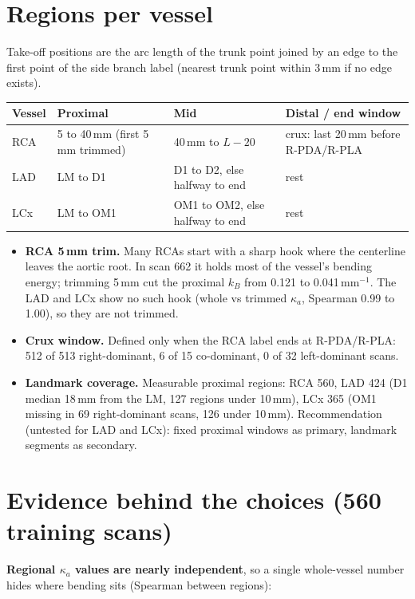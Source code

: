 \documentclass[11pt,a4paper]{article}
\newcommand{\ka}{\kappa_a}
\begin{document}
\section{Regions per vessel}
Take-off positions are the arc length of the trunk point joined by an edge to the first point of the side
branch label (nearest trunk point within 3\,mm if no edge exists).

\begin{center}
\small
\begin{tabular}{@{}lp{3.6cm}p{4.2cm}p{4.6cm}@{}}
\toprule
Vessel & Proximal & Mid & Distal / end window\\
\midrule
RCA & 5 to 40\,mm (first 5\,mm trimmed) & 40\,mm to $L-20$ & crux: last 20\,mm before R-PDA/R-PLA\\
LAD & LM to D1 & D1 to D2, else halfway to end & rest\\
LCx & LM to OM1 & OM1 to OM2, else halfway to end & rest\\
\bottomrule
\end{tabular}
\end{center}

\begin{itemize}
\item \textbf{RCA 5\,mm trim.} Many RCAs start with a sharp hook where the centerline leaves the aortic
  root. In scan 662 it holds most of the vessel's bending energy; trimming 5\,mm cut the proximal $k_B$
  from 0.121 to 0.041\,mm$^{-1}$. The LAD and LCx show no such hook (whole vs trimmed $\ka$, Spearman
  0.99 to 1.00), so they are not trimmed.
\item \textbf{Crux window.} Defined only when the RCA label ends at R-PDA/R-PLA: 512 of 513 right-dominant,
  6 of 15 co-dominant, 0 of 32 left-dominant scans.
\item \textbf{Landmark coverage.} Measurable proximal regions: RCA 560, LAD 424 (D1 median 18\,mm from the LM,
  127 regions under 10\,mm), LCx 365 (OM1 missing in 69 right-dominant scans, 126 under 10\,mm).
  Recommendation (untested for LAD and LCx): fixed proximal windows as primary, landmark segments as secondary.
\end{itemize}

\section{Evidence behind the choices (560 training scans)}

\textbf{Regional $\ka$ values are nearly independent}, so a single whole-vessel number hides where
bending sits (Spearman between regions):
\end{document}
